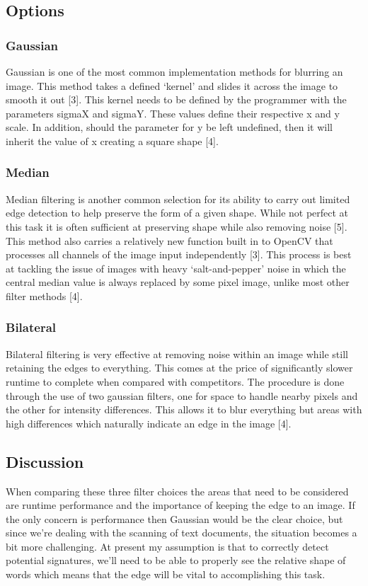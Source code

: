 \documentclass[onecolumn, draftclsnofoot,10pt, compsoc]{IEEEtran}
\begin{document}
\subsection{Options}
\subsubsection{Gaussian}
Gaussian is one of the most common implementation methods for blurring an image. This method takes a defined ‘kernel’ and slides it across the image to smooth it out [3]. This kernel needs to be defined by the programmer with the parameters sigmaX and sigmaY. These values define their respective x and y scale. In addition, should the parameter for y be left undefined, then it will inherit the value of x creating a square shape [4].

\subsubsection{Median}
Median filtering is another common selection for its ability to carry out limited edge detection to help preserve the form of a given shape. While not perfect at this task it is often sufficient at preserving shape while also removing noise [5]. This method also carries a relatively new function built in to OpenCV that processes all channels of the image input independently [3]. This process is best at tackling the issue of images with heavy ‘salt-and-pepper’ noise in which the central median value is always replaced by some pixel image, unlike most other filter methods [4].

\subsubsection{Bilateral}
Bilateral filtering is very effective at removing noise within an image while still retaining the edges to everything. This comes at the price of significantly slower runtime to complete when compared with competitors. The procedure is done through the use of two gaussian filters, one for space to handle nearby pixels and the other for intensity differences. This allows it to blur everything but areas with high differences which naturally indicate an edge in the image [4]. 

\subsection{Discussion}
When comparing these three filter choices the areas that need to be considered are runtime performance and the importance of keeping the edge to an image. If the only concern is performance then Gaussian would be the clear choice, but since we’re dealing with the scanning of text documents, the situation becomes a bit more challenging. At present my assumption is that to correctly detect potential signatures, we’ll need to be able to properly see the relative shape of words which means that the edge will be vital to accomplishing this task. 
\end{document}
